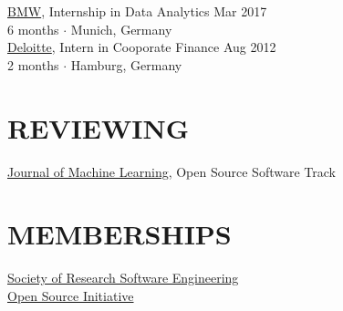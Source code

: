 \documentclass{cv}
\begin{document}
\href{https://www.bmw.com/en/index.html}{BMW}, Internship in Data Analytics  \hfill Mar 2017 \\
{\color{lightgray} 6 months $\cdot$ Munich, Germany} \\

\href{https://www2.deloitte.com/}{Deloitte}, Intern in Cooporate Finance  \hfill Aug 2012 \\
{\color{lightgray} 2 months $\cdot$ Hamburg, Germany} \\

\section{REVIEWING}

\href{https://www.jmlr.org}{Journal of Machine Learning}, Open Source Software Track

\section{MEMBERSHIPS}

\href{https://society-rse.org/}{Society of Research Software Engineering} \\

\href{http://opensource.org}{Open Source Initiative}

\end{document}
